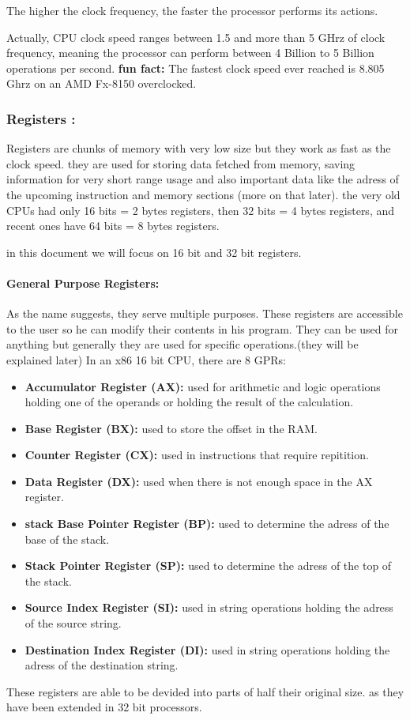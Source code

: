 \documentclass[10pt]{article}
\begin{document}
    The higher the clock frequency, the faster the processor performs its actions.
    
    Actually, CPU clock speed ranges between 1.5 and more than 5 GHrz of clock frequency, 
    meaning the processor can perform between 4 Billion to 5 Billion operations per second.
    \textbf{fun fact: }The fastest clock speed ever reached is 8.805 Ghrz on an AMD Fx-8150 overclocked.

    \subsubsection{Registers :}
    Registers are chunks of memory with very low size but they work as fast as the clock speed. 
    they are used for storing data fetched from memory, 
    saving information for very short range usage and also important data like the adress of the upcoming instruction and memory sections (more on that later).
    the very old CPUs had only 16 bits = 2 bytes registers, then 32 bits = 4 bytes registers, and recent ones have 
    64 bits = 8 bytes registers.

    in this document we will focus on 16 bit and 32 bit registers.
    \paragraph{General Purpose Registers: }As the name suggests, they serve multiple purposes.
    These registers are accessible to the user so he can modify their contents in his program.
    They can be used for anything but generally they are used for specific operations.(they will be explained later)
    In an x86 16 bit CPU, there are 8 GPRs: 
    \begin{itemize}
        \item \textbf{Accumulator Register (AX):}  used for arithmetic and logic operations holding one of the operands or holding the result of the calculation.
        \item \textbf{Base Register (BX):}  used to store the offset in the RAM.
        \item \textbf{Counter Register (CX):}  used in instructions that require repitition.
        \item \textbf{Data Register (DX):}  used when there is not enough space in the AX register.
        \item \textbf{stack Base Pointer Register (BP):}  used to determine the adress of the base of the stack.
        \item \textbf{Stack Pointer Register (SP):}  used to determine the adress of the top of the stack.
        \item \textbf{Source Index Register (SI):}  used in string operations holding the adress of the source string.
        \item \textbf{Destination Index Register (DI):}  used in string operations holding the adress of the destination string.
    \end{itemize}
    These registers are able to be devided into parts of half their original size. as they have been extended in 32 bit processors.
\end{document}
